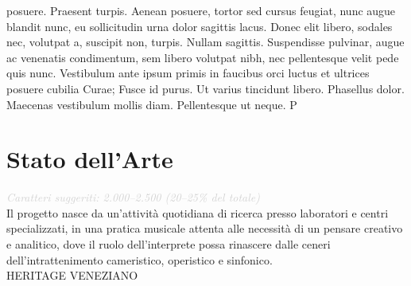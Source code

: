 \documentclass[a4paper,12pt]{article}
\begin{document}
posuere. Praesent turpis. Aenean posuere, tortor sed cursus feugiat, nunc augue blandit nunc, eu sollicitudin urna dolor sagittis lacus. Donec elit libero, sodales nec, volutpat a, suscipit non, turpis. Nullam sagittis. Suspendisse pulvinar, augue ac venenatis condimentum, sem libero volutpat nibh, nec pellentesque velit pede quis nunc. Vestibulum ante ipsum primis in faucibus orci luctus et ultrices posuere cubilia Curae; Fusce id purus. Ut varius tincidunt libero. Phasellus dolor. Maecenas vestibulum mollis diam. Pellentesque ut neque. P

\section{Stato dell'Arte}
{\small\textcolor{lightgray}{\textit{Caratteri suggeriti: 2.000--2.500 (20--25\% del totale)}}}\\

Il progetto nasce da un'attività quotidiana di ricerca presso laboratori
e centri specializzati, in una pratica musicale attenta alle necessità di un
pensare creativo e analitico, dove il ruolo dell'interprete possa rinascere
dalle ceneri dell'intrattenimento cameristico, operistico e sinfonico.\\
HERITAGE VENEZIANO
\end{document}
